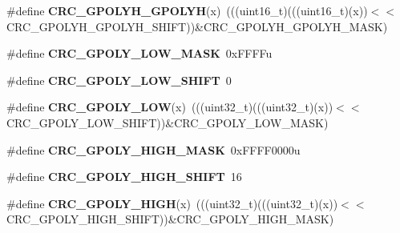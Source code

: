 \begin{DoxyCompactItemize}
\item 
\#define {\bfseries C\+R\+C\+\_\+\+G\+P\+O\+L\+Y\+H\+\_\+\+G\+P\+O\+L\+YH}(x)~(((uint16\+\_\+t)(((uint16\+\_\+t)(x))$<$$<$C\+R\+C\+\_\+\+G\+P\+O\+L\+Y\+H\+\_\+\+G\+P\+O\+L\+Y\+H\+\_\+\+S\+H\+I\+FT))\&C\+R\+C\+\_\+\+G\+P\+O\+L\+Y\+H\+\_\+\+G\+P\+O\+L\+Y\+H\+\_\+\+M\+A\+SK)\hypertarget{group__CRC__Register__Masks_gaf8f26eea960e536b264b1a5b1d494b07}{}\label{group__CRC__Register__Masks_gaf8f26eea960e536b264b1a5b1d494b07}

\item 
\#define {\bfseries C\+R\+C\+\_\+\+G\+P\+O\+L\+Y\+\_\+\+L\+O\+W\+\_\+\+M\+A\+SK}~0x\+F\+F\+F\+Fu\hypertarget{group__CRC__Register__Masks_ga861d4f6f458051a63a7b01e6e5d8794b}{}\label{group__CRC__Register__Masks_ga861d4f6f458051a63a7b01e6e5d8794b}

\item 
\#define {\bfseries C\+R\+C\+\_\+\+G\+P\+O\+L\+Y\+\_\+\+L\+O\+W\+\_\+\+S\+H\+I\+FT}~0\hypertarget{group__CRC__Register__Masks_ga3830f95399bd5190027aaf00f307d10b}{}\label{group__CRC__Register__Masks_ga3830f95399bd5190027aaf00f307d10b}

\item 
\#define {\bfseries C\+R\+C\+\_\+\+G\+P\+O\+L\+Y\+\_\+\+L\+OW}(x)~(((uint32\+\_\+t)(((uint32\+\_\+t)(x))$<$$<$C\+R\+C\+\_\+\+G\+P\+O\+L\+Y\+\_\+\+L\+O\+W\+\_\+\+S\+H\+I\+FT))\&C\+R\+C\+\_\+\+G\+P\+O\+L\+Y\+\_\+\+L\+O\+W\+\_\+\+M\+A\+SK)\hypertarget{group__CRC__Register__Masks_ga66c5ae199c9bb4ee3951fea40d201c27}{}\label{group__CRC__Register__Masks_ga66c5ae199c9bb4ee3951fea40d201c27}

\item 
\#define {\bfseries C\+R\+C\+\_\+\+G\+P\+O\+L\+Y\+\_\+\+H\+I\+G\+H\+\_\+\+M\+A\+SK}~0x\+F\+F\+F\+F0000u\hypertarget{group__CRC__Register__Masks_ga96c07e55f3d3c43d7b3e7637bc854ed6}{}\label{group__CRC__Register__Masks_ga96c07e55f3d3c43d7b3e7637bc854ed6}

\item 
\#define {\bfseries C\+R\+C\+\_\+\+G\+P\+O\+L\+Y\+\_\+\+H\+I\+G\+H\+\_\+\+S\+H\+I\+FT}~16\hypertarget{group__CRC__Register__Masks_ga991debc471e54dcf5297d6a42c5778e6}{}\label{group__CRC__Register__Masks_ga991debc471e54dcf5297d6a42c5778e6}

\item 
\#define {\bfseries C\+R\+C\+\_\+\+G\+P\+O\+L\+Y\+\_\+\+H\+I\+GH}(x)~(((uint32\+\_\+t)(((uint32\+\_\+t)(x))$<$$<$C\+R\+C\+\_\+\+G\+P\+O\+L\+Y\+\_\+\+H\+I\+G\+H\+\_\+\+S\+H\+I\+FT))\&C\+R\+C\+\_\+\+G\+P\+O\+L\+Y\+\_\+\+H\+I\+G\+H\+\_\+\+M\+A\+SK)\hypertarget{group__CRC__Register__Masks_ga7e1477223f91dd35945f2f5895a346c5}{}\label{group__CRC__Register__Masks_ga7e1477223f91dd35945f2f5895a346c5}


\end{DoxyCompactItemize}
